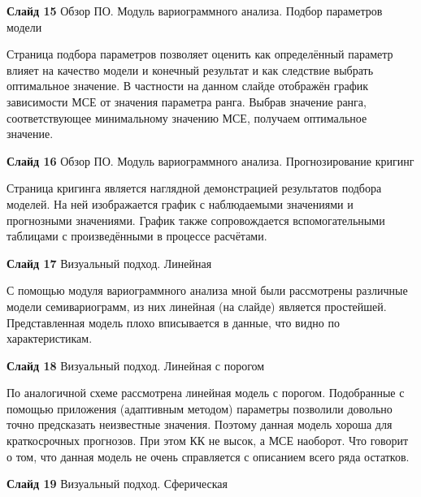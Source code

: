 \documentclass[a4paper,10pt]{report}
\begin{document}
\textbf{Слайд 15} Обзор ПО. Модуль вариограммного анализа. Подбор параметров модели

Страница подбора параметров позволяет оценить как определённый параметр влияет на качество модели и конечный результат и как следствие выбрать оптимальное значение. В частности на данном слайде отображён график зависимости МСЕ от значения параметра ранга. Выбрав значение ранга, соответствующее минимальному значению МСЕ, получаем оптимальное значение.

\textbf{Слайд 16} Обзор ПО. Модуль вариограммного анализа. Прогнозирование кригинг

Страница кригинга является наглядной демонстрацией результатов подбора моделей. На ней изображается график с наблюдаемыми значениями и прогнозными значениями. График также сопровождается вспомогательными таблицами с произведёнными в процессе расчётами.

\textbf{Слайд 17} Визуальный подход. Линейная

С помощью модуля вариограммного анализа мной были рассмотрены различные модели семивариограмм, из них линейная (на слайде) является простейшей. Представленная модель плохо вписывается в данные, что видно по характеристикам.



\textbf{Слайд 18} Визуальный подход. Линейная с порогом

По аналогичной схеме рассмотрена линейная модель с порогом. Подобранные с помощью приложения (адаптивным методом) параметры позволили довольно точно предсказать неизвестные значения. Поэтому данная модель хороша для краткосрочных прогнозов. При этом КК не высок, а МСЕ наоборот. Что говорит о том, что данная модель не очень справляется с описанием всего ряда остатков.

\textbf{Слайд 19} Визуальный подход. Сферическая
\end{document}
